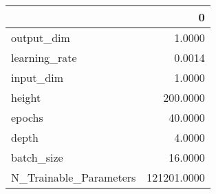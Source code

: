\begin{tabular}{lr}
\toprule
{} &            0 \\
\midrule
output\_dim             &       1.0000 \\
learning\_rate          &       0.0014 \\
input\_dim              &       1.0000 \\
height                 &     200.0000 \\
epochs                 &      40.0000 \\
depth                  &       4.0000 \\
batch\_size             &      16.0000 \\
N\_Trainable\_Parameters &  121201.0000 \\
\bottomrule
\end{tabular}
